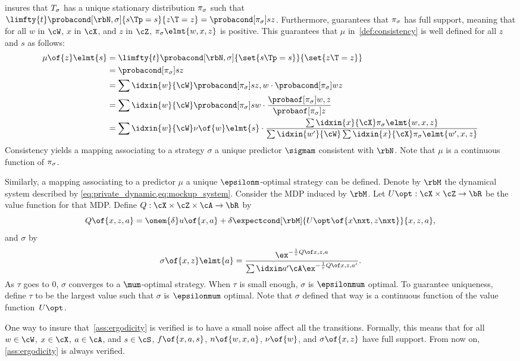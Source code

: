  insures that \(T_{\sigma}\) has a unique stationary distribution \(\pi_{\sigma}\) such that \(\limfty{t}\probacond[\rbN, \sigma]{s\Tp = s}{z\T = z} = \probacond[\pi\strat{\sigma}]{s}{z}\).
Furthermore,  guarantees that \(\pi_{\sigma}\) has full support, meaning that for all \(w\) in \(\cW\), \(x\) in \(\cX\), and \(z\) in \(\cZ\), \(\pi\strat{\sigma}\elmt{w,x,z}\) is positive.
This guarantees that \(\mu\) in~\cref{def:consistency} is well defined for all \(z\) and \(s\) as follows:
\begin{align*}
\mu \of{z} \elmt{s}
&= \limfty{t}\probacond[\rbN, \sigma]{\set{s\Tp = s}}{\set{z\T = z}} \\
&= \probacond[\pi\strat{\sigma}]{s}{z} \\
&= \sum\idxin{w}{\cW} \probacond[\pi\strat{\sigma}]{s}{z, w} \cdot \probacond[\pi\strat{\sigma}]{w}{z} \\
&= \sum\idxin{w}{\cW} \probacond[\pi\strat{\sigma}]{s}{w} \cdot \frac{\probaof[\pi\strat{\sigma}]{w, z}}{\probaof[\pi\strat{\sigma}]{z}} \\
&= \sum\idxin{w}{\cW} \nu\of{w}\elmt{s} \cdot \frac{\sum\idxin{x}{\cX} \pi\strat{\sigma}\elmt{w,x,z}}{\sum\idxin{w'}{\cW}\sum\idxin{x}{\cX} \pi\strat{\sigma}\elmt{w',x,z}}
\end{align*}
Consistency yields a mapping associating to a strategy \(\sigma\) a unique predictor \(\sigmam\) consistent with \(\rbN\).
Note that \(\mu\) is a continuous function of \(\pi_{\sigma}\).

Similarly, a mapping associating to a predictor \(\mu\) a unique \(\epsilonm\)-optimal strategy can be defined.
Denote by \(\rbM\) the dynamical system described by \cref{eq:private_dynamic,eq:mockup_system}.
Consider the MDP induced by \(\rbM\).
Let \(\Uopt : \cX \times \cZ \to \bR\) be the value function for that MDP.
Define \(Q : \cX \times \cZ \times \cA \to \bR\) by
\[
Q \of{x, z, a} = \onem{\delta} u \of{x, a} + \delta \expectcond[\rbM]{\Uopt \of{x\nxt, z\nxt}}{x, z, a},
\]
and \(\sigma\) by
\[
\sigma \of{x, z} \elmt{a} = \gibbsQ.
\]
As \(\tau\) goes to \(0\), \(\sigma\) converges to a \(\mum\)-optimal strategy.
When \(\tau\) is small enough, \(\sigma\) is \(\epsilonmum\) optimal.
To guarantee uniqueness, define \(\tau\) to be the largest value such that \(\sigma\) is \(\epsilonmum\) optimal.
Note that \(\sigma\) defined that way is a continuous function of the value function~\(\Uopt\).

One way to insure that~\cref{ass:ergodicity} is verified is to have a small noise affect all the transitions.
Formally, this means that for all \(w \in \cW\), \(x \in \cX\), \(a \in \cA\), and \(s \in \cS\), \(f \of{x, a, s}\), \(n \of{w, x, a}\), \(\nu \of{w}\), and \(\sigma \of{x, z}\) have full support.
From now on, \cref{ass:ergodicity} is always verified.

